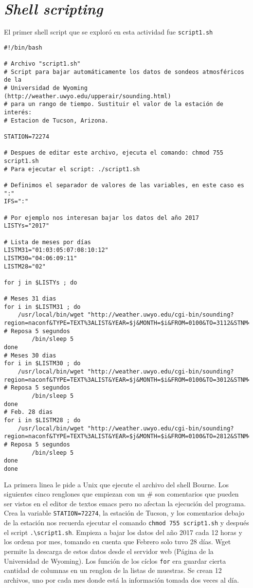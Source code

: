 \documentclass[12pt]{article}
\begin{document}

\section{\emph{Shell scripting}}
\noindent
El primer shell script que se explor\'o en esta actividad fue \texttt{script1.sh}

\begin{verbatim}
#!/bin/bash

# Archivo "script1.sh"
# Script para bajar automáticamente los datos de sondeos atmosféricos de la
# Universidad de Wyoming (http://weather.uwyo.edu/upperair/sounding.html)
# para un rango de tiempo. Sustituir el valor de la estación de interés:
# Estacion de Tucson, Arizona.

STATION=72274

# Despues de editar este archivo, ejecuta el comando: chmod 755 script1.sh
# Para ejecutar el script: ./script1.sh

# Definimos el separador de valores de las variables, en este caso es ":" 
IFS=":"

# Por ejemplo nos interesan bajar los datos del año 2017
LISTYs="2017"

# Lista de meses por días
LISTM31="01:03:05:07:08:10:12"
LISTM30="04:06:09:11"
LISTM28="02"

for j in $LISTYs ; do

# Meses 31 dias
for i in $LISTM31 ; do
	/usr/local/bin/wget "http://weather.uwyo.edu/cgi-bin/sounding?region=naconf&TYPE=TEXT%3ALIST&YEAR=$j&MONTH=$i&FROM=0100&TO=3112&STNM=$STATION"
# Reposa 5 segundos
        /bin/sleep 5
done
# Meses 30 dias
for i in $LISTM30 ; do
	/usr/local/bin/wget "http://weather.uwyo.edu/cgi-bin/sounding?region=naconf&TYPE=TEXT%3ALIST&YEAR=$j&MONTH=$i&FROM=0100&TO=3012&STNM=$STATION"
# Reposa 5 segundos
        /bin/sleep 5
done
# Feb. 28 dias
for i in $LISTM28 ; do
	/usr/local/bin/wget "http://weather.uwyo.edu/cgi-bin/sounding?region=naconf&TYPE=TEXT%3ALIST&YEAR=$j&MONTH=$i&FROM=0100&TO=2812&STNM=$STATION"
# Reposa 5 segundos
        /bin/sleep 5
done
done
\end{verbatim}

La primera linea le pide a Unix que ejecute el archivo del shell Bourne. Los siguientes cinco renglones que empiezan con un \# son comentarios que pueden ser vistos en el editor de textos emacs pero no afectan la ejecuci\'on del programa. Crea la variable \texttt{STATION=72274}, la estaci\'on de Tucson, y los comentarios debajo de la estaci\'on nos recuerda ejecutar el comando \texttt{chmod 755 script1.sh} y despu\'es el script \texttt{.\textbackslash{script1.sh}}. Empieza a bajar los datos del año 2017 cada 12 horas y los ordena por mes, tomando en cuenta que Febrero solo tuvo 28 d\'ias. Wget permite la descarga de estos datos desde el servidor web (P\'agina de la Universidad de Wyoming). Los funci\'on de los c\'iclos \texttt{for} era guardar cierta cantidad de columnas en un renglon de la listas de muestras. Se crean 12 archivos, uno por cada mes donde est\'a la informaci\'on tomada dos veces al d\'ia. 
\end{document}
